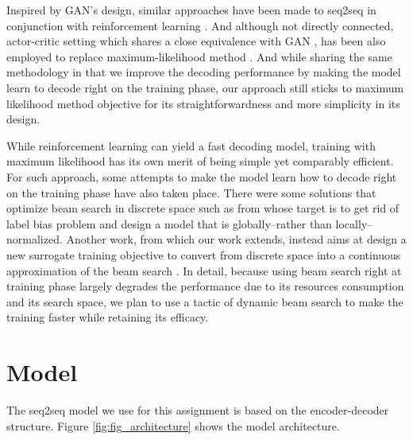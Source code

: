 \documentclass[11pt,a4paper]{article}
\begin{document}
Inspired by GAN's design, similar approaches have been made to seq2seq in conjunction with reinforcement learning \cite{kusner2016gans, yu2017seqgan,gu2017neural, gumbel2017}. And although not directly connected, actor-critic setting which shares a close equivalence with GAN \cite{pfau2016connecting}, has been also employed to replace maximum-likelihood method \cite{bahdanau2017actor}. And while sharing the same methodology in that we improve the decoding performance by making the model learn to decode right on the training phase, our approach still sticks to maximum likelihood method objective for its straightforwardness and more simplicity in its design.  

While reinforcement learning can yield a fast decoding model, training with maximum likelihood has its own merit of being simple yet comparably efficient. For such approach, some attempts to make the model learn how to decode right on the training phase have also taken place. There were some solutions that optimize beam search in discrete space such as from \citet{wiseman2016sequence, andor2016globally} whose target is to get rid of label bias problem and design a model that is globally--rather than locally--normalized. Another work, from which our work extends, instead aims at design a new surrogate training objective to convert from discrete space into a continuous approximation of the beam search \cite{goyal2018continuous}. In detail, because using beam search right at training phase largely degrades the performance due to its resources consumption and its search space, we plan to use a tactic of dynamic beam search \cite{buckman2016transition} to make the training faster while retaining its efficacy. 



\section{Model} \label{ssec:model}

The seq2seq model we use for this assignment is based on the encoder-decoder structure. Figure \ref{fig:fig_architecture} shows the model architecture.
\end{document}
